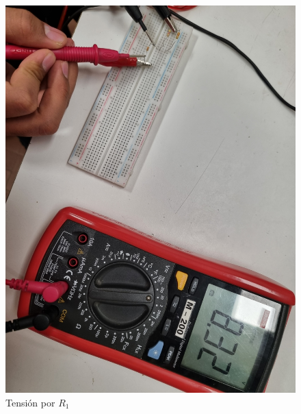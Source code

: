 \documentclass[a4paper,12pt]{article}
\begin{document}
\begin{figure}[H]
    \centering
    \begin{minipage}{0.40\textwidth}
        \centering
        \includegraphics[width=\linewidth]{imagenes/tensioni1.jpg}
        \caption*{Tensión por $R_1$}
    \end{minipage}
    \hfill
    \begin{minipage}{0.40\textwidth}
        \centering

\end{minipage}
\end{figure}
\end{document}
